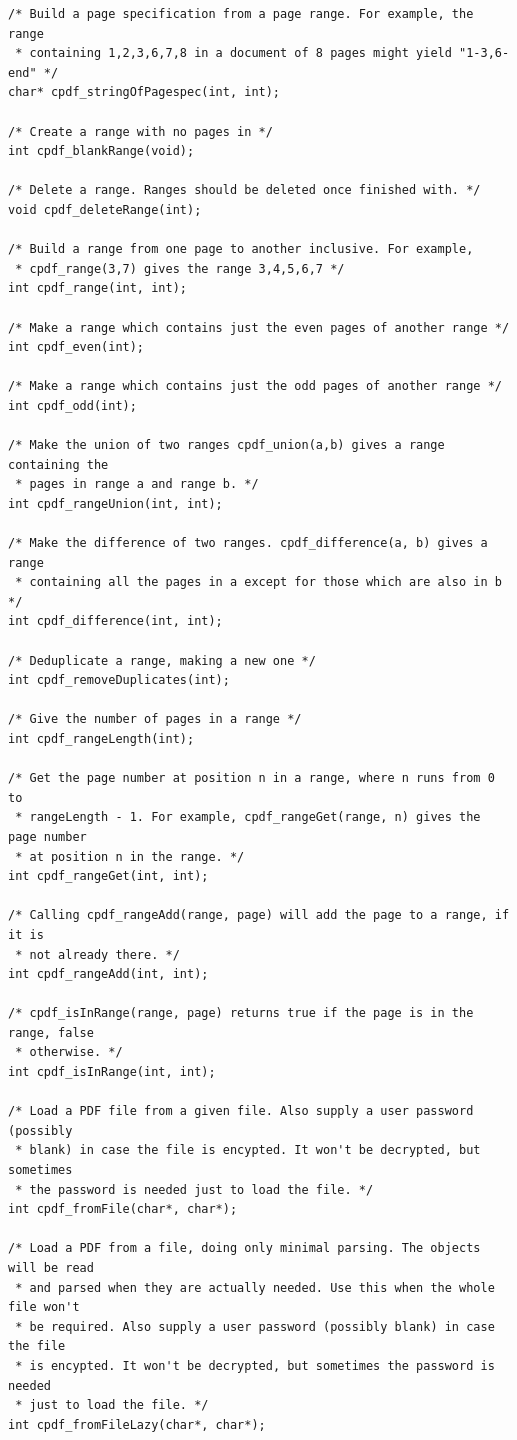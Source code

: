 \documentclass[a4paper]{memoir}
\begin{document}
\begin{small}
\begin{lstlisting}
/* Build a page specification from a page range. For example, the range
 * containing 1,2,3,6,7,8 in a document of 8 pages might yield "1-3,6-end" */
char* cpdf_stringOfPagespec(int, int);

/* Create a range with no pages in */
int cpdf_blankRange(void);

/* Delete a range. Ranges should be deleted once finished with. */
void cpdf_deleteRange(int);

/* Build a range from one page to another inclusive. For example,
 * cpdf_range(3,7) gives the range 3,4,5,6,7 */
int cpdf_range(int, int);

/* Make a range which contains just the even pages of another range */
int cpdf_even(int);

/* Make a range which contains just the odd pages of another range */
int cpdf_odd(int);

/* Make the union of two ranges cpdf_union(a,b) gives a range containing the
 * pages in range a and range b. */
int cpdf_rangeUnion(int, int);

/* Make the difference of two ranges. cpdf_difference(a, b) gives a range
 * containing all the pages in a except for those which are also in b */
int cpdf_difference(int, int);

/* Deduplicate a range, making a new one */
int cpdf_removeDuplicates(int);

/* Give the number of pages in a range */
int cpdf_rangeLength(int);

/* Get the page number at position n in a range, where n runs from 0 to
 * rangeLength - 1. For example, cpdf_rangeGet(range, n) gives the page number
 * at position n in the range. */
int cpdf_rangeGet(int, int);

/* Calling cpdf_rangeAdd(range, page) will add the page to a range, if it is
 * not already there. */
int cpdf_rangeAdd(int, int);

/* cpdf_isInRange(range, page) returns true if the page is in the range, false
 * otherwise. */
int cpdf_isInRange(int, int);

/* Load a PDF file from a given file. Also supply a user password (possibly
 * blank) in case the file is encypted. It won't be decrypted, but sometimes
 * the password is needed just to load the file. */
int cpdf_fromFile(char*, char*);

/* Load a PDF from a file, doing only minimal parsing. The objects will be read
 * and parsed when they are actually needed. Use this when the whole file won't
 * be required. Also supply a user password (possibly blank) in case the file
 * is encypted. It won't be decrypted, but sometimes the password is needed
 * just to load the file. */
int cpdf_fromFileLazy(char*, char*);


\end{lstlisting}
\end{small}
\end{document}

